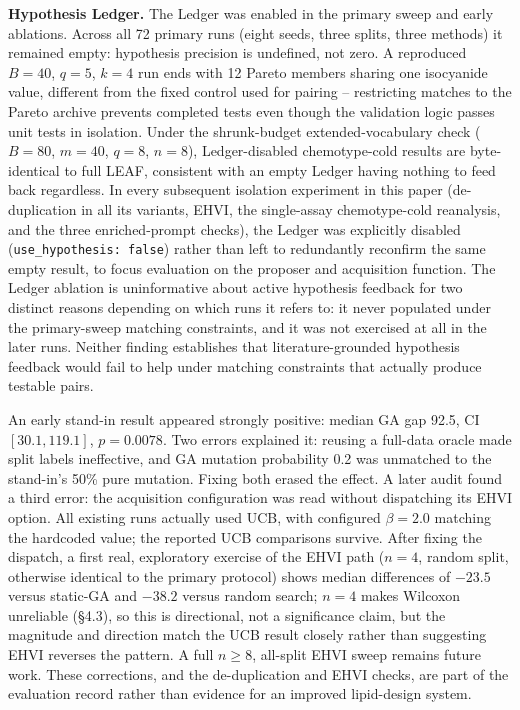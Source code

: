 \documentclass{article}
\begin{document}
\textbf{Hypothesis Ledger.} The Ledger was enabled in the primary sweep and early ablations. Across all 72 primary runs (eight seeds, three splits, three methods) it remained empty: hypothesis precision is undefined, not zero. A reproduced $B=40$, $q=5$, $k=4$ run ends with 12 Pareto members sharing one isocyanide value, different from the fixed control used for pairing -- restricting matches to the Pareto archive prevents completed tests even though the validation logic passes unit tests in isolation. Under the shrunk-budget extended-vocabulary check ($B=80$, $m=40$, $q=8$, $n=8$), Ledger-disabled chemotype-cold results are byte-identical to full LEAF, consistent with an empty Ledger having nothing to feed back regardless. In every subsequent isolation experiment in this paper (de-duplication in all its variants, EHVI, the single-assay chemotype-cold reanalysis, and the three enriched-prompt checks), the Ledger was explicitly disabled (\texttt{use\_hypothesis: false}) rather than left to redundantly reconfirm the same empty result, to focus evaluation on the proposer and acquisition function. The Ledger ablation is uninformative about active hypothesis feedback for two distinct reasons depending on which runs it refers to: it never populated under the primary-sweep matching constraints, and it was not exercised at all in the later runs. Neither finding establishes that literature-grounded hypothesis feedback would fail to help under matching constraints that actually produce testable pairs.

An early stand-in result appeared strongly positive: median GA gap 92.5, CI $[30.1,119.1]$, $p=0.0078$. Two errors explained it: reusing a full-data oracle made split labels ineffective, and GA mutation probability 0.2 was unmatched to the stand-in's 50\% pure mutation. Fixing both erased the effect. A later audit found a third error: the acquisition configuration was read without dispatching its EHVI option. All existing runs actually used UCB, with configured $\beta=2.0$ matching the hardcoded value; the reported UCB comparisons survive. After fixing the dispatch, a first real, exploratory exercise of the EHVI path ($n=4$, random split, otherwise identical to the primary protocol) shows median differences of $-23.5$ versus static-GA and $-38.2$ versus random search; $n=4$ makes Wilcoxon unreliable (\S4.3), so this is directional, not a significance claim, but the magnitude and direction match the UCB result closely rather than suggesting EHVI reverses the pattern. A full $n\ge8$, all-split EHVI sweep remains future work. These corrections, and the de-duplication and EHVI checks, are part of the evaluation record rather than evidence for an improved lipid-design system.
\end{document}
